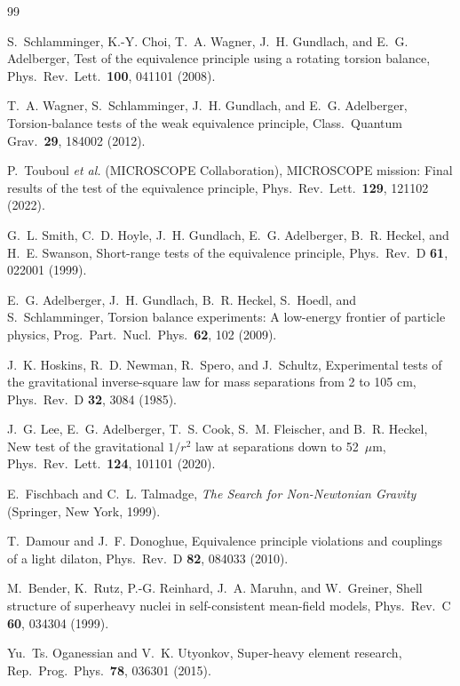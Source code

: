 \documentclass[aps,prd,onecolumn,superscriptaddress,floatfix,nofootinbib]{revtex4-2}
\begin{document}
\begin{thebibliography}{99}

S.~Schlamminger, K.-Y. Choi, T.~A. Wagner, J.~H. Gundlach, and E.~G. Adelberger,
Test of the equivalence principle using a rotating torsion balance,
Phys.\ Rev.\ Lett.\ \textbf{100}, 041101 (2008).

T.~A. Wagner, S.~Schlamminger, J.~H. Gundlach, and E.~G. Adelberger,
Torsion-balance tests of the weak equivalence principle,
Class.\ Quantum Grav.\ \textbf{29}, 184002 (2012).

P.~Touboul \textit{et al.} (MICROSCOPE Collaboration),
MICROSCOPE mission: Final results of the test of the equivalence principle,
Phys.\ Rev.\ Lett.\ \textbf{129}, 121102 (2022).

G.~L. Smith, C.~D. Hoyle, J.~H. Gundlach, E.~G. Adelberger, B.~R. Heckel, and H.~E. Swanson,
Short-range tests of the equivalence principle,
Phys.\ Rev.\ D \textbf{61}, 022001 (1999).

E.~G. Adelberger, J.~H. Gundlach, B.~R. Heckel, S.~Hoedl, and S.~Schlamminger,
Torsion balance experiments: A low-energy frontier of particle physics,
Prog.\ Part.\ Nucl.\ Phys.\ \textbf{62}, 102 (2009).

J.~K. Hoskins, R.~D. Newman, R.~Spero, and J.~Schultz,
Experimental tests of the gravitational inverse-square law for mass separations from 2 to 105 cm,
Phys.\ Rev.\ D \textbf{32}, 3084 (1985).

J.~G. Lee, E.~G. Adelberger, T.~S. Cook, S.~M. Fleischer, and B.~R. Heckel,
New test of the gravitational $1/r^2$ law at separations down to 52~$\mu$m,
Phys.\ Rev.\ Lett.\ \textbf{124}, 101101 (2020).

E.~Fischbach and C.~L. Talmadge,
\textit{The Search for Non-Newtonian Gravity} (Springer, New York, 1999).

T.~Damour and J.~F. Donoghue,
Equivalence principle violations and couplings of a light dilaton,
Phys.\ Rev.\ D \textbf{82}, 084033 (2010).

M.~Bender, K.~Rutz, P.-G. Reinhard, J.~A. Maruhn, and W.~Greiner,
Shell structure of superheavy nuclei in self-consistent mean-field models,
Phys.\ Rev.\ C \textbf{60}, 034304 (1999).

Yu.~Ts. Oganessian and V.~K. Utyonkov,
Super-heavy element research,
Rep.\ Prog.\ Phys.\ \textbf{78}, 036301 (2015).


\end{thebibliography}
\end{document}
